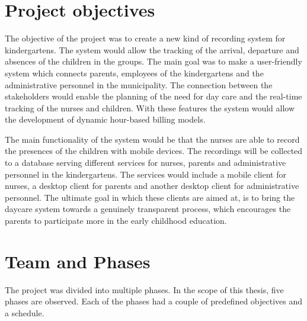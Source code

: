 
 \section{Project objectives}

The objective of the project was to create a new kind of recording system for kindergartens. The system would allow the tracking of the arrival, departure and absences of the children in the groups. The main goal was to make a user-friendly system which connects parents, employees of the kindergartens and the administrative personnel in the municipality. The connection between the stakeholders would enable the planning of the need for day care and the real-time tracking of the nurses and children. With these features the system would allow the development of dynamic hour-based billing models.

The main functionality of the system would be that the nurses are able to record the presences of the children with mobile devices. The recordings will be collected to a database serving different services for nurses, parents and administrative personnel in the kindergartens. The services would include a mobile client for nurses, a desktop client for parents and another desktop client for administrative personnel. The ultimate goal in which these clients are aimed at, is to bring the daycare system towards a genuinely transparent process, which encourages the parents to participate more in the early childhood education.


 \section{Team and Phases}

The project was divided into multiple phases. In the scope of this thesis, five phases are observed. Each of the phases had a couple of predefined objectives and a schedule.








